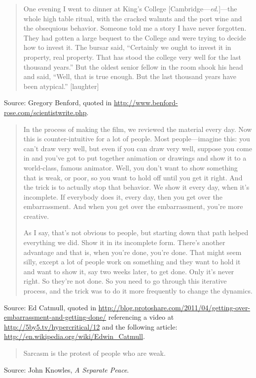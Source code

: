 \documentclass[a4paper]{article}
\begin{document}
\begin{quote}
One evening I went to dinner at King's College
[Cambridge---\emph{ed.}]---the whole high table ritual, with the cracked
walnuts and the port wine and the obsequious behavior. Someone told me
a story I have never forgotten. They had gotten a large bequest to the
College and were trying to decide how to invest it. The bursar said,
``Certainly we ought to invest it in property, real property. That has
stood the college very well for the last thousand years.'' But the oldest
senior fellow in the room shook his head and said, ``Well, that is true
enough. But the last thousand years have been atypical.'' [laughter]
\end{quote}
Source: Gregory Benford, quoted in \url{http://www.benford-rose.com/scientistwrite.php}.
\medskip

\begin{quotation}
	In the process of making the film, we reviewed the material every
	day.  Now this is counter-intuitive for a lot of people.  Most
	people---imagine this: you can't draw very well, but even if
	you can draw very well, suppose you come in and you've got to
	put together animation or drawings and show it to a world-class,
	famous animator.  Well, you don't want to show something that is
	weak, or poor, so you want to hold off until you get it right.
	And the trick is to actually stop that behavior.  We show it
	every day, when it's incomplete.  If everybody does it, every
	day, then you get over the embarrassment.  And when you get over
	the embarrassment, you're more creative.

	As I say, that's not obvious to people, but starting down
	that path helped everything we did.  Show it in its incomplete
	form.  There's another advantage and that is, when you're done,
	you're done.  That might seem silly, except a lot of people work
	on something and they want to hold it and want to show it, say
	two weeks later, to get done.  Only it's never right.  So they're
	not done.  So you need to go through this iterative process,
	and the trick was to do it more frequently to change the dynamics.
\end{quotation}
Source: Ed Catmull, quoted in
\url{http://blog.protoshare.com/2011/04/getting-over-embarrassment-and-getting-done/}
referencing a video at \url{http://5by5.tv/hypercritical/12} and the
following article: \url{http://en.wikipedia.org/wiki/Edwin_Catmull}.
\medskip

\begin{quote}
	Sarcasm is the protest of people who are weak.
\end{quote}
Source: John Knowles, \emph{A Separate Peace}.
\medskip
\end{document}

